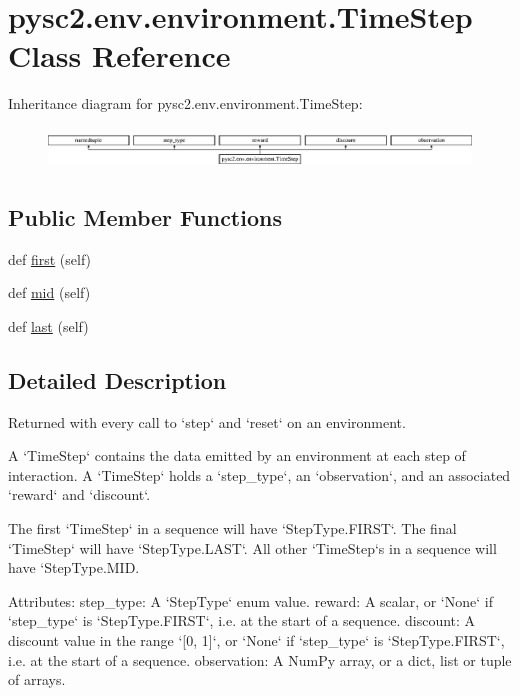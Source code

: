 \hypertarget{classpysc2_1_1env_1_1environment_1_1_time_step}{}\section{pysc2.\+env.\+environment.\+Time\+Step Class Reference}
\label{classpysc2_1_1env_1_1environment_1_1_time_step}
Inheritance diagram for pysc2.\+env.\+environment.\+Time\+Step\+:\begin{figure}[H]
\begin{center}
\leavevmode
\includegraphics[height=1.082126cm]{classpysc2_1_1env_1_1environment_1_1_time_step}
\end{center}
\end{figure}
\subsection*{Public Member Functions}
\begin{DoxyCompactItemize}
\item 
def \mbox{\hyperlink{classpysc2_1_1env_1_1environment_1_1_time_step_a18be60fc3df62720fad06b591f1e6ba4}{first}} (self)
\item 
def \mbox{\hyperlink{classpysc2_1_1env_1_1environment_1_1_time_step_a78c8f32550b9e2111308630b6e35089c}{mid}} (self)
\item 
def \mbox{\hyperlink{classpysc2_1_1env_1_1environment_1_1_time_step_a81781d0bdeae3de43ffebd4bc08cebac}{last}} (self)
\end{DoxyCompactItemize}


\subsection{Detailed Description}
\begin{DoxyVerb}Returned with every call to `step` and `reset` on an environment.

A `TimeStep` contains the data emitted by an environment at each step of
interaction. A `TimeStep` holds a `step_type`, an `observation`, and an
associated `reward` and `discount`.

The first `TimeStep` in a sequence will have `StepType.FIRST`. The final
`TimeStep` will have `StepType.LAST`. All other `TimeStep`s in a sequence will
have `StepType.MID.

Attributes:
  step_type: A `StepType` enum value.
  reward: A scalar, or `None` if `step_type` is `StepType.FIRST`, i.e. at the
    start of a sequence.
  discount: A discount value in the range `[0, 1]`, or `None` if `step_type`
    is `StepType.FIRST`, i.e. at the start of a sequence.
  observation: A NumPy array, or a dict, list or tuple of arrays.
\end{DoxyVerb}
 

